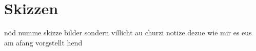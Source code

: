\chapter{Skizzen}

nöd numme skizze bilder
sondern villicht au churzi notize dezue wie mir es eus am afang vorgstellt hend

